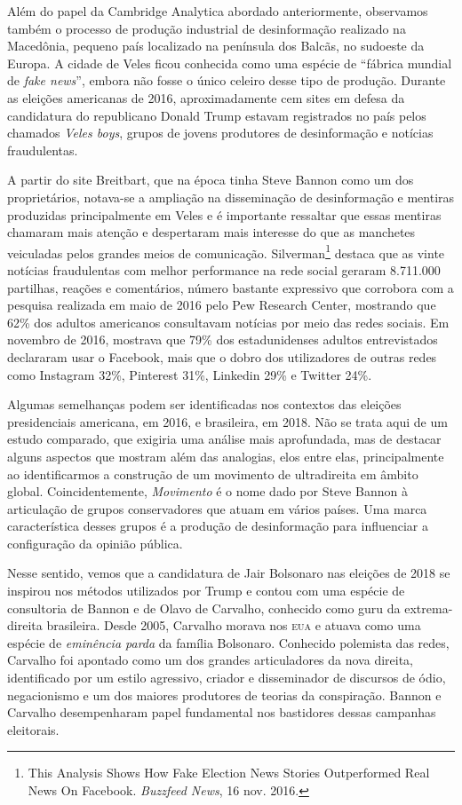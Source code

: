 Além do papel da Cambridge Analytica abordado anteriormente, observamos
também o processo de produção industrial de desinformação realizado na
Macedônia, pequeno país localizado na península dos Balcãs, no sudoeste
da Europa. A cidade de Veles ficou conhecida como uma espécie de
``fábrica mundial de \textit{fake news}'', embora não fosse o único
celeiro desse tipo de produção. Durante as eleições americanas de 2016,
aproximadamente cem sites em defesa da candidatura do republicano Donald
Trump estavam registrados no país pelos chamados \textit{Veles boys}, grupos de
jovens produtores de desinformação e notícias fraudulentas.

A partir do site Breitbart, que na época tinha Steve Bannon como um dos
proprietários, notava-se a ampliação na disseminação de desinformação e
mentiras produzidas principalmente em Veles e é importante ressaltar que
essas mentiras chamaram mais atenção e despertaram mais interesse do que
as manchetes veiculadas pelos grandes meios de comunicação. Silverman\footnote{This Analysis Shows How Fake Election News
Stories Outperformed Real News On Facebook. \textit{Buzzfeed News}, 16 nov. 2016.}
destaca que as vinte notícias fraudulentas com melhor performance
na rede social geraram 8.711.000 partilhas, reações e comentários,
número bastante expressivo que corrobora com a pesquisa realizada em
maio de 2016 pelo Pew Research Center, mostrando que 62\% dos adultos
americanos consultavam notícias por meio das redes sociais. Em novembro
de 2016, mostrava que 79\% dos estadunidenses adultos entrevistados
declararam usar o Facebook, mais que o dobro dos utilizadores de outras
redes como Instagram 32\%, Pinterest 31\%, Linkedin 29\% e Twitter 24\%.

Algumas semelhanças podem ser identificadas nos contextos das eleições
presidenciais americana, em 2016, e brasileira, em 2018. Não se trata aqui
de um estudo comparado, que exigiria uma análise mais aprofundada, mas de
destacar alguns aspectos que mostram além das analogias, elos entre
elas, principalmente ao identificarmos a construção de um movimento de
ultradireita em âmbito global. Coincidentemente, \textit{Movimento} é o nome dado
por Steve Bannon à articulação de grupos conservadores que atuam em
vários países. Uma marca característica desses grupos é a produção de
desinformação para influenciar a configuração da opinião pública.

Nesse sentido, vemos que a candidatura de Jair Bolsonaro nas eleições de
2018 se inspirou nos métodos utilizados por Trump e contou com uma
espécie de consultoria de Bannon e de Olavo de Carvalho, conhecido como
guru da extrema-direita brasileira. Desde 2005, Carvalho morava nos \textsc{eua}
e atuava como uma espécie de \textit{eminência parda} da família Bolsonaro.
Conhecido polemista das redes, Carvalho foi apontado como um dos grandes
articuladores da nova direita, identificado por um estilo agressivo,
criador e disseminador de discursos de ódio, negacionismo e um dos
maiores produtores de teorias da conspiração. Bannon e Carvalho
desempenharam papel fundamental nos bastidores dessas campanhas
eleitorais.

